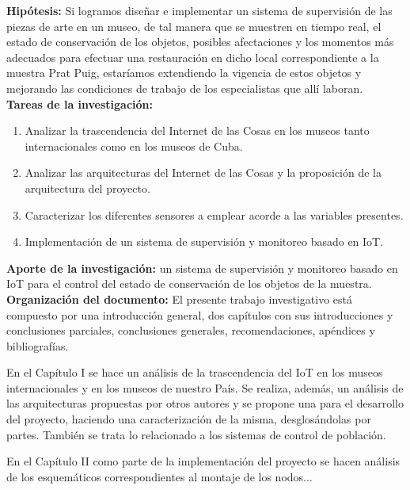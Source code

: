     \textbf{Hipótesis:} Si logramos diseñar e implementar un sistema de supervisión de las piezas de arte en un museo, de tal manera que se muestren en tiempo real, el estado de conservación de los objetos, posibles afectaciones y los momentos más adecuados para efectuar una restauración en dicho local correspondiente a la muestra Prat Puig, estaríamos extendiendo la vigencia de estos objetos y mejorando las condiciones de trabajo de los especialistas que allí laboran.\\

    \textbf{Tareas de la investigación:}
    \begin{enumerate} %
        \item Analizar la trascendencia del Internet de las Cosas en los museos tanto internacionales como en los museos de Cuba.
        \item Analizar las arquitecturas del Internet de las Cosas y la proposición de la arquitectura del proyecto.
        \item Caracterizar los diferentes sensores a emplear acorde a las variables presentes.
        \item Implementación de un sistema de supervisión y monitoreo basado en IoT.
    \end{enumerate}

    \textbf{Aporte de la investigación: } un sistema de supervisión y monitoreo basado en IoT para el control del estado de conservación de los objetos de la muestra.\\

    \textbf{Organización del documento: }El presente trabajo investigativo está compuesto por una introducción general, dos capítulos con sus introducciones y conclusiones parciales, conclusiones generales, recomendaciones, apéndices y bibliografías.

    En el Capítulo I se hace un análisis de la trascendencia del IoT en los museos internacionales y en los museos de nuestro País.
    Se realiza, además, un análisis de las arquitecturas propuestas por otros autores y se propone una para el desarrollo del proyecto, haciendo una caracterización de la misma, desglosándolas por partes.
    También se trata lo relacionado a los sistemas de control de población.

    En el Capítulo II como parte de la implementación del proyecto se hacen análisis de los esquemáticos correspondientes al montaje de los nodos...

    
